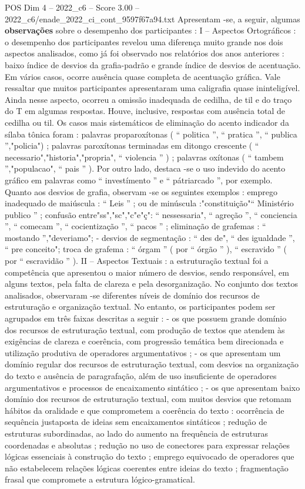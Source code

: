 \begin{textsample}{POS Dim 4 – 2022\_c6 – Score 3.00 – 2022\_c6/enade\_2022\_ci\_cont\_9597f67a94.txt}
Apresentam -se, a seguir, algumas \textbf{observações} sobre o desempenho dos participantes : I – Aspectos Ortográficos : o desempenho dos participantes revelou uma diferença muito grande nos dois aspectos analisados, como já foi observado nos relatórios dos anos anteriores : baixo índice de desvios da grafia-padrão e grande índice de desvios de acentuação.
Em vários casos, ocorre ausência quase completa de acentuação gráfica.
Vale ressaltar que muitos participantes apresentaram uma caligrafia quase ininteligível.
Ainda nesse aspecto, ocorreu a omissão inadequada de cedilha, de til e do traço do T em algumas respostas.
Houve, inclusive, respostas com ausência total de cedilha ou til.
Os casos mais sistemáticos de eliminação do acento indicador da sílaba tônica foram : palavras proparoxítonas ( “ politica ”, “ pratica ”, “ publica ”,"policia") ; palavras paroxítonas terminadas em ditongo crescente ( “ necessario","historia","propria", “ violencia ” ) ; palavras oxítonas ( “ tambem ”,"populacao", “ pais ” ).
Por outro lado, destaca -se o uso indevido do acento gráfico em palavras como “ investímento ” e “ pátriarcado ”, por exemplo.
Quanto aos desvios de grafia, observam -se os seguintes exemplos : emprego inadequado de maiúscula : “ Leis ” ; ou de minúscula :"constituição"“ Ministério publico ” ; confusão entre"ss","sc","c"e"ç": “ nessessaria", “ agreção ”, “ conciencia ”, “ comecam ”, “ cocientização ”, “ pacos ” ; eliminação de grafemas : “ mostando ”,"deveriamo"; - desvios de segmentação : “ des de", “ des igualdade ”, “ pre conceito"; troca de grafema : “ órgam ” ( por “ órgão ” ), “ escravido ” ( por “ escravidão ” ).
II – Aspectos Textuais : a estruturação textual foi a competência que apresentou o maior número de desvios, sendo responsável, em alguns textos, pela falta de clareza e pela desorganização.
No conjunto dos textos analisados, observaram -se diferentes níveis de domínio dos recursos de estruturação e organização textual.
No entanto, os participantes podem ser agrupados em três faixas descritas a seguir : - os que possuem grande domínio dos recursos de estruturação textual, com produção de textos que atendem às exigências de clareza e coerência, com progressão temática bem direcionada e utilização produtiva de operadores argumentativos ; - os que apresentam um domínio regular dos recursos de estruturação textual, com desvios na organização do texto e ausência de paragrafação, além de uso insuficiente de operadores argumentativos e processos de encaixamento sintático ; - os que apresentam baixo domínio dos recursos de estruturação textual, com muitos desvios que retomam hábitos da oralidade e que comprometem a coerência do texto : ocorrência de sequência justaposta de ideias sem encaixamentos sintáticos ; redução de estruturas subordinadas, ao lado do aumento na frequência de estruturas coordenadas e absolutas ; redução no uso de conectores para expressar relações lógicas essenciais à construção do texto ; emprego equivocado de operadores que não estabelecem relações lógicas coerentes entre ideias do texto ; fragmentação frasal que compromete a estrutura lógico-gramatical.

\end{textsample}
